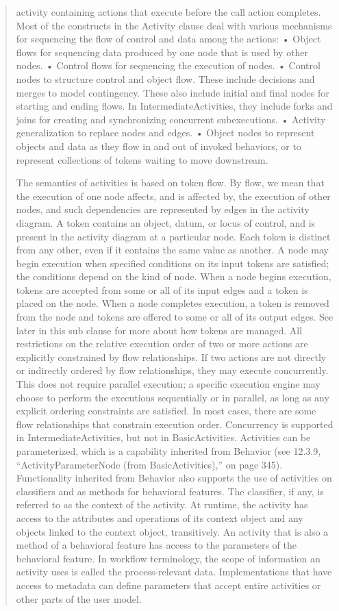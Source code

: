 \begin{quotation}
activity containing actions that execute before the call action completes.
Most of the constructs in the Activity clause deal with various mechanisms for sequencing the flow of control and data
among the actions:
• Object flows for sequencing data produced by one node that is used by other nodes.
• Control flows for sequencing the execution of nodes.
• Control nodes to structure control and object flow. These include decisions and merges to model contingency. These
also include initial and final nodes for starting and ending flows. In IntermediateActivities, they include forks and joins
for creating and synchronizing concurrent subexecutions.
• Activity generalization to replace nodes and edges.
• Object nodes to represent objects and data as they flow in and out of invoked behaviors, or to represent collections of
tokens waiting to move downstream.

The semantics of activities is based on token flow. By flow, we mean that the execution of one node affects, and is
affected by, the execution of other nodes, and such dependencies are represented by edges in the activity diagram. A token
contains an object, datum, or locus of control, and is present in the activity diagram at a particular node. Each token is
distinct from any other, even if it contains the same value as another. A node may begin execution when specified
conditions on its input tokens are satisfied; the conditions depend on the kind of node. When a node begins execution,
tokens are accepted from some or all of its input edges and a token is placed on the node. When a node completes
execution, a token is removed from the node and tokens are offered to some or all of its output edges. See later in this sub
clause for more about how tokens are managed.
All restrictions on the relative execution order of two or more actions are explicitly constrained by flow relationships. If
two actions are not directly or indirectly ordered by flow relationships, they may execute concurrently. This does not
require parallel execution; a specific execution engine may choose to perform the executions sequentially or in parallel, as
long as any explicit ordering constraints are satisfied. In most cases, there are some flow relationships that constrain
execution order. Concurrency is supported in IntermediateActivities, but not in BasicActivities.
Activities can be parameterized, which is a capability inherited from Behavior (see 12.3.9, “ActivityParameterNode (from
BasicActivities),” on page 345). Functionality inherited from Behavior also supports the use of activities on classifiers
and as methods for behavioral features. The classifier, if any, is referred to as the context of the activity. At runtime, the
activity has access to the attributes and operations of its context object and any objects linked to the context object,
transitively. An activity that is also a method of a behavioral feature has access to the parameters of the behavioral
feature. In workflow terminology, the scope of information an activity uses is called the process-relevant data.
Implementations that have access to metadata can define parameters that accept entire activities or other parts of the user
model.


\end{quotation}
